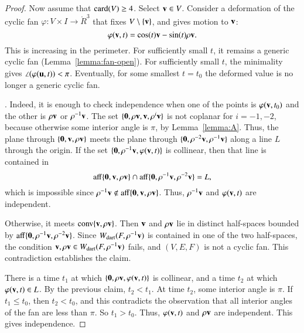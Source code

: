 \begin{proof}
Now assume that ${\operatorname{card}}(V)\ge 4$.  Select ${\mathbf v}\in V$.  Consider a deformation of the cyclic fan $\varphi:V\times I \to \ring{R}^3$ that fixes $V\setminus\{{\mathbf v}\}$, and gives motion to ${\mathbf v}$:
$$
\varphi({\mathbf v},t) = \cos(t) {\mathbf v} - \sin(t) \rho {\mathbf v}.
$$
This is increasing in the perimeter.    For sufficiently small $t$,  it remains a generic cyclic fan (Lemma~\ref{lemma:fan-open}).  For sufficiently small $t$, the minimality gives $\angle(\varphi({\mathbf u},t))<\pi$.
Eventually, for some smallest $t=t_0$ the deformed value is no longer a generic cyclic fan.




.  Indeed, it is enough to check independence when one of the points is $\varphi({\mathbf v},t_0)$ and the other is $\rho{\mathbf v}$ or $\rho^{-1}{\mathbf v}$.  The set $\{{\mathbf 0},\rho{\mathbf v},{\mathbf v},\rho^i{\mathbf v}\}$ is not coplanar for $i=-1,-2$, because otherwise some interior angle is $\pi$, by Lemma~\ref{lemma:A}.   
Thus, the plane through $\{{\mathbf 0},{\mathbf v},\rho{\mathbf v}\}$ meets the plane through $\{{\mathbf 0},\rho^{-2}{\mathbf v},\rho^{-1}{\mathbf v}\}$ along a line $L$ through the origin.  
If the set $\{{\mathbf 0},\rho^{-1}{\mathbf v},\varphi({\mathbf v},t)\}$ is collinear, then that line is contained in $${\operatorname{aff}}\{{\mathbf 0},{\mathbf v},\rho{\mathbf v}\}\cap{\operatorname{aff}}\{{\mathbf 0},\rho^{-1}{\mathbf v},\rho^{-2}{\mathbf v}\}=L,$$ which is impossible since $\rho^{-1}{\mathbf v}\not\in {\operatorname{aff}}\{{\mathbf 0},{\mathbf v},\rho{\mathbf v}\}$.  Thus, $\rho^{-1}{\mathbf v}$ and $\varphi({\mathbf v},t)$ are independent.

  Otherwise,
it meets ${\operatorname{conv}}\{{\mathbf v},\rho{\mathbf v}\}$.  Then ${\mathbf v}$ and $\rho{\mathbf v}$ lie in distinct half-spaces
bounded by ${\operatorname{aff}}\{{\mathbf 0},\rho^{-1}{\mathbf v},\rho^{-2}{\mathbf v}\}$.  Since $W_{\text{dart}}(F,\rho^{-1}{\mathbf v})$ is contained in one of the two half-spaces, the condition ${\mathbf v},\rho{\mathbf v}\in W_{\text{dart}}(F,\rho^{-1}{\mathbf v})$ fails, and $(V,E,F)$ is not a cyclic fan.  This contradiction establishes the claim.

There is a time $t_1$ at which $\{{\mathbf 0},\rho{\mathbf v},\varphi({\mathbf v},t)\}$ is collinear, and a time $t_2$ at which $\varphi({\mathbf v},t)\in L$.  By the previous claim, $t_2<t_1$.
At time $t_2$,  some interior angle is $\pi$.  If $t_1\le t_0$, then $t_2 < t_0$, and this contradicts the observation that all interior angles of the fan are less than $\pi$.  So $t_1> t_0$. Thus, $\varphi({\mathbf v},t)$ and $\rho{\mathbf v}$ are independent. This gives independence.


\end{proof}
